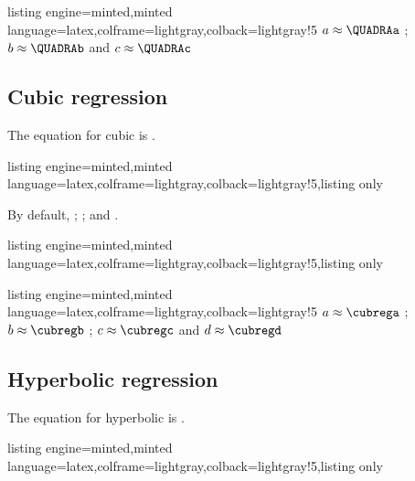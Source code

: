 \documentclass[11pt,a4paper]{ltxdoc}
\begin{document}
\begin{tcblisting}{listing engine=minted,minted language=latex,colframe=lightgray,colback=lightgray!5}
\xintquadreg[coeffa=QUADRAa,coeffb=QUADRAb,coeffc=QUADRAc,round=4/3/2]{\LLX}{\LLY}%
$a \approx \QUADRAa$ ; $b \approx \QUADRAb$ and $c \approx \QUADRAc$
\end{tcblisting}

\subsection{Cubic regression}%

The equation for cubic is .

\begin{tcblisting}{listing engine=minted,minted language=latex,colframe=lightgray,colback=lightgray!5,listing only}
\end{tcblisting}

By default,  ;  ;  and .

\begin{tcblisting}{listing engine=minted,minted language=latex,colframe=lightgray,colback=lightgray!5,listing only}
\def\LLX{83,71,64,69,69,64,68,59,81,91,57,65,58,62}%
\def\LLY{183,168,171,178,176,172,165,158,183,182,163,175,164,175}%
\end{tcblisting}

\begin{tcblisting}{listing engine=minted,minted language=latex,colframe=lightgray,colback=lightgray!5}
\xintcubreg[round=5/3/2/1]{\LLX}{\LLY}%
$a \approx \cubrega$ ; $b \approx \cubregb$ ; $c \approx \cubregc$ and $d \approx \cubregd$
\end{tcblisting}

\subsection{Hyperbolic regression}

The equation for hyperbolic is .

\begin{tcblisting}{listing engine=minted,minted language=latex,colframe=lightgray,colback=lightgray!5,listing only}
\end{tcblisting}
\end{document}
